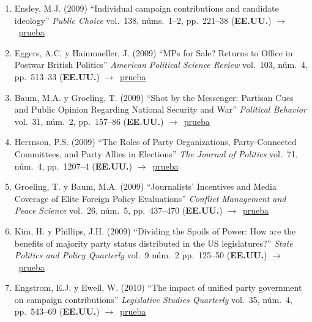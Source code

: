 \documentclass[12 pt, letter]{article}
\newenvironment{CitasMiTrabajo}{
    \begin{footnotesize}
    \begin{enumerate}[label={\footnotesize\emph{cita~\arabic*}},ref=\arabic*] %
        \setlength{\itemsep}{.1\itemsep}
        \setlength{\parskip}{.1\parskip}
    }{\end{enumerate}\end{footnotesize}}
\begin{document}
\begin{CitasMiTrabajo}
        \item Ensley, M.J. (2009)
        ``Individual campaign contributions and
        candidate ideology'' \emph{Public Choice} vol.\ 138, n\'ums.\
        1--2, pp.\ 221--38  (\textbf{EE.UU.}) $\rightarrow$~\href{http://ericmagar.com/cv/cites/coxMagar/ensley.pdf}{prueba}

        \item Eggers, A.C. y Hainmueller, J. (2009)
        ``MPs for Sale? Returns to Office in Postwar British Politics''
        \emph{American Political Science Review} vol.\ 103, n\'um.\ 4, pp.\ 513--33  (\textbf{EE.UU.}) $\rightarrow$~\href{http://ericmagar.com/cv/cites/coxMagar/eggers.pdf}{prueba}

        \item Baum, M.A. y Groeling, T. (2009)
        ``Shot by the Messenger: Partisan Cues and Public Opinion
        Regarding National Security and War''
        \emph{Political Behavior}  vol.\ 31, n\'um.\ 2, pp.\ 157--86 (\textbf{EE.UU.}) $\rightarrow$~\href{http://ericmagar.com/cv/cites/coxMagar/baum.pdf}{prueba}

        \item Herrnson, P.S. (2009) ``The Roles of Party Organizations, Party-Connected Committees, and Party Allies in Elections'' \emph{The Journal of Politics} vol.\ 71, n\'um.\ 4, pp.\ 1207--4 (\textbf{EE.UU.}) $\rightarrow$~\href{http://ericmagar.com/cv/cites/coxMagar/herrnsonPartyOrginEls2009jop.pdf}{prueba}

        \item Groeling, T. y Baum, M.A. (2009) ``Journalists' Incentives and Media Coverage of Elite Foreign Policy Evaluations''
            \emph{Conflict Management and Peace Science} vol.\ 26, n\'um.\ 5, pp.\ 437--470 (\textbf{EE.UU.}) $\rightarrow$~\href{http://ericmagar.com/cv/cites/coxMagar/groeling+baumJournalists2009.pdf}{prueba}

       \item Kim, H. y Phillips, J.H. (2009) ``Dividing the Spoils of Power: How are the benefits of majority party status distributed in the US legislatures?'' \emph{State Politics and Policy Quarterly} vol.\ 9 n\'um.\ 2 pp.\ 125--50 (\textbf{EE.UU.}) $\rightarrow$~\href{http://ericmagar.com/cv/cites/coxMagar/kim+philips.pdf}{prueba}

        \item Engstrom, E.J. y Ewell, W. (2010)
        ``The impact of unified party government on campaign contributions'' \emph{Legislative Studies Quarterly} vol.\ 35, n\'um.\ 4, pp.\ 543--69 (\textbf{EE.UU.}) $\rightarrow$~\href{http://ericmagar.com/cv/cites/coxMagar/eng.pdf}{prueba}


\end{CitasMiTrabajo}
\end{document}
